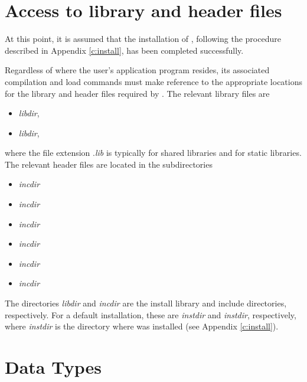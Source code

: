 \section{Access to library and header files}\label{ss:file_access}

At this point, it is assumed that the installation of {\cvode},
following the procedure described in Appendix \ref{c:install}, has
been completed successfully.

Regardless of where the user's application program resides, its
associated compilation and load commands must make reference to the
appropriate locations for the library and header files required by
{\cvode}.  The relevant library files are
\begin{itemize}
\item {\em libdir},
\item {\em libdir},
\end{itemize}
where the file extension .{\em lib} is typically  for shared libraries
and  for static libraries. The relevant header files are located in
the subdirectories
\begin{itemize}
\item {\em incdir}
\item {\em incdir}
\item {\em incdir}
\item {\em incdir}
\item {\em incdir}
\item {\em incdir}
\end{itemize}
The directories {\em libdir} and {\em incdir} are the install library and include
directories, respectively. For a default installation, these are {\em instdir} and
{\em instdir}, respectively, where {\em instdir} is the directory
where {\sundials} was installed (see Appendix \ref{c:install}).


\section{Data Types}\label{s:types}


